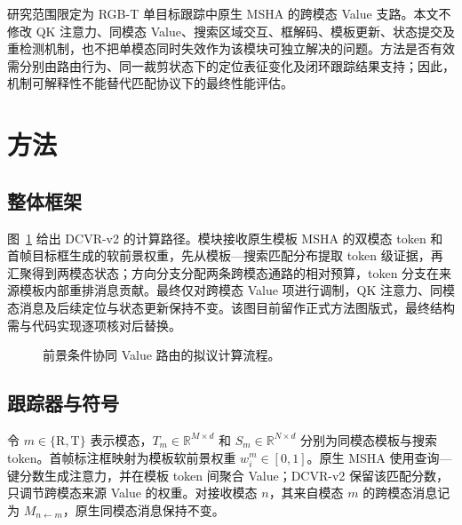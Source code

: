 \documentclass[journal]{IEEEtran}
\newcommand{\R}{\mathrm{R}}
\newcommand{\T}{\mathrm{T}}
\begin{document}
研究范围限定为 RGB-T 单目标跟踪中原生 MSHA 的跨模态 Value 支路。本文不修改 QK 注意力、同模态 Value、搜索区域交互、框解码、模板更新、状态提交及重检测机制，也不把单模态同时失效作为该模块可独立解决的问题。方法是否有效需分别由路由行为、同一裁剪状态下的定位表征变化及闭环跟踪结果支持；因此，机制可解释性不能替代匹配协议下的最终性能评估。

\section{方法}
\subsection{整体框架}
图~\ref{fig:framework} 给出 DCVR-v2 的计算路径。模块接收原生模板 MSHA 的双模态 token 和首帧目标框生成的软前景权重，先从模板—搜索匹配分布提取 token 级证据，再汇聚得到两模态状态；方向分支分配两条跨模态通路的相对预算，token 分支在来源模板内部重排消息贡献。最终仅对跨模态 Value 项进行调制，QK 注意力、同模态消息及后续定位与状态更新保持不变。该图目前留作正式方法图版式，最终结构需与代码实现逐项核对后替换。

\begin{figure}[!t]
\centering
{}
\caption{前景条件协同 Value 路由的拟议计算流程。}
\label{fig:framework}
\end{figure}

\subsection{跟踪器与符号}
令 $m\in\{\R,\T\}$ 表示模态，$T_m\in\mathbb{R}^{M\times d}$ 和 $S_m\in\mathbb{R}^{N\times d}$ 分别为同模态模板与搜索 token。首帧标注框映射为模板软前景权重 $w_i^m\in[0,1]$。原生 MSHA 使用查询—键分数生成注意力，并在模板 token 间聚合 Value；DCVR-v2 保留该匹配分数，只调节跨模态来源 Value 的权重。对接收模态 $n$，其来自模态 $m$ 的跨模态消息记为 $M_{n\leftarrow m}$，原生同模态消息保持不变。
\end{document}
